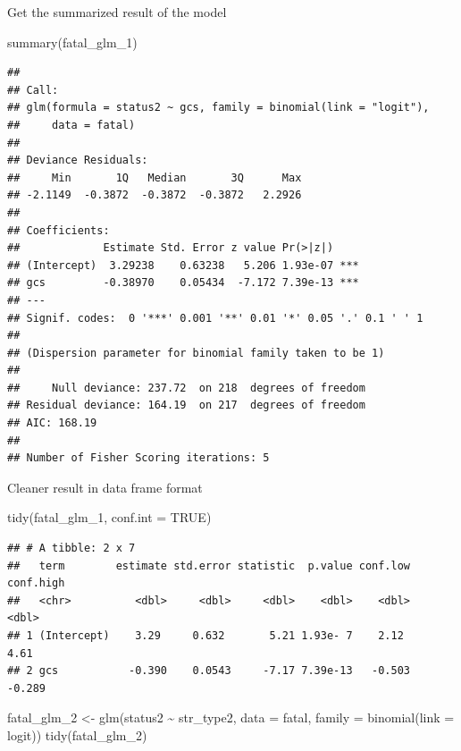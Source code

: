 \documentclass[
]{book}
\makeatletter
\newenvironment{Shaded}{\begin{snugshade}}{\end{snugshade}}
\newcommand{\AttributeTok}[1]{\textcolor[rgb]{0.61,0.61,0.61}{#1}}
\newcommand{\ConstantTok}[1]{\textcolor[rgb]{0,0,0}{#1}}
\newcommand{\FunctionTok}[1]{\textcolor[rgb]{0,0,0}{#1}}
\newcommand{\NormalTok}[1]{#1}
\newcommand{\OtherTok}[1]{\textcolor[rgb]{0.37,0.37,0.37}{#1}}
\newcommand{\SpecialCharTok}[1]{\textcolor[rgb]{0,0,0}{#1}}
\newcommand{\StringTok}[1]{\textcolor[rgb]{0.5,0.5,0.5}{#1}}
\newenvironment{kframe}{%
\medskip{}
\setlength{\fboxsep}{.8em}
 \def\at@end@of@kframe{}%
 \ifinner\ifhmode%
  \def\at@end@of@kframe{\end{minipage}}%
  \begin{minipage}{\columnwidth}%
 \fi\fi%
 \def\FrameCommand##1{\hskip\@totalleftmargin \hskip-\fboxsep
 \colorbox{shadecolor}{##1}\hskip-\fboxsep
     \hskip-\linewidth \hskip-\@totalleftmargin \hskip\columnwidth}%
 \MakeFramed {\advance\hsize-\width
   \@totalleftmargin\z@ \linewidth\hsize
   \@setminipage}}%
 {\par\unskip\endMakeFramed%
 \at@end@of@kframe}
\renewenvironment{Shaded}{\begin{kframe}}{\end{kframe}}
\makeatother
\begin{document}
Get the summarized result of the model

\begin{Shaded}
\begin{Highlighting}[]
\FunctionTok{summary}\NormalTok{(fatal\_glm\_1)}
\end{Highlighting}
\end{Shaded}

\begin{verbatim}
## 
## Call:
## glm(formula = status2 ~ gcs, family = binomial(link = "logit"), 
##     data = fatal)
## 
## Deviance Residuals: 
##     Min       1Q   Median       3Q      Max  
## -2.1149  -0.3872  -0.3872  -0.3872   2.2926  
## 
## Coefficients:
##             Estimate Std. Error z value Pr(>|z|)    
## (Intercept)  3.29238    0.63238   5.206 1.93e-07 ***
## gcs         -0.38970    0.05434  -7.172 7.39e-13 ***
## ---
## Signif. codes:  0 '***' 0.001 '**' 0.01 '*' 0.05 '.' 0.1 ' ' 1
## 
## (Dispersion parameter for binomial family taken to be 1)
## 
##     Null deviance: 237.72  on 218  degrees of freedom
## Residual deviance: 164.19  on 217  degrees of freedom
## AIC: 168.19
## 
## Number of Fisher Scoring iterations: 5
\end{verbatim}

Cleaner result in data frame format

\begin{Shaded}
\begin{Highlighting}[]
\FunctionTok{tidy}\NormalTok{(fatal\_glm\_1, }\AttributeTok{conf.int =} \ConstantTok{TRUE}\NormalTok{)}
\end{Highlighting}
\end{Shaded}

\begin{verbatim}
## # A tibble: 2 x 7
##   term        estimate std.error statistic  p.value conf.low conf.high
##   <chr>          <dbl>     <dbl>     <dbl>    <dbl>    <dbl>     <dbl>
## 1 (Intercept)    3.29     0.632       5.21 1.93e- 7    2.12      4.61 
## 2 gcs           -0.390    0.0543     -7.17 7.39e-13   -0.503    -0.289
\end{verbatim}

\begin{Shaded}
\begin{Highlighting}[]
\NormalTok{fatal\_glm\_2 }\OtherTok{\textless{}{-}} \FunctionTok{glm}\NormalTok{(status2 }\SpecialCharTok{\textasciitilde{}}\NormalTok{ str\_type2, }\AttributeTok{data =}\NormalTok{ fatal, }
                    \AttributeTok{family =} \FunctionTok{binomial}\NormalTok{(}\AttributeTok{link =} \StringTok{\textquotesingle{}logit\textquotesingle{}}\NormalTok{))}
\FunctionTok{tidy}\NormalTok{(fatal\_glm\_2)}
\end{Highlighting}
\end{Shaded}
\end{document}
